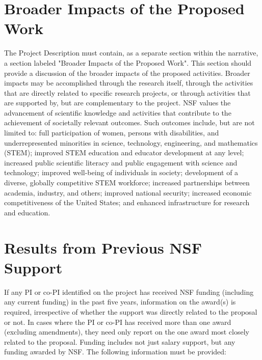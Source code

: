 \section{Broader Impacts of the Proposed Work}
The Project Description must contain, as a separate section within the
narrative, a section labeled "Broader Impacts of the Proposed
Work". This section should provide a discussion of the broader impacts
of the proposed activities. Broader impacts may be accomplished
through the research itself, through the activities that are directly
related to specific research projects, or through activities that are
supported by, but are complementary to the project. NSF values the
advancement of scientific knowledge and activities that contribute to
the achievement of societally relevant outcomes. Such outcomes
include, but are not limited to: full participation of women, persons
with disabilities, and underrepresented minorities in science,
technology, engineering, and mathematics (STEM); improved STEM
education and educator development at any level; increased public
scientific literacy and public engagement with science and technology;
improved well-being of individuals in society; development of a
diverse, globally competitive STEM workforce; increased partnerships
between academia, industry, and others; improved national security;
increased economic competitiveness of the United States; and enhanced
infrastructure for research and education.



\section{Results from Previous NSF Support}
If any PI or co-PI identified on the project has received NSF funding
(including any current funding) in the past five years, information on
the award(s) is required, irrespective of whether the support was
directly related to the proposal or not. In cases where the PI or
co-PI has received more than one award (excluding amendments), they
need only report on the one award most closely related to the
proposal. Funding includes not just salary support, but any funding
awarded by NSF. The following information must be provided:

